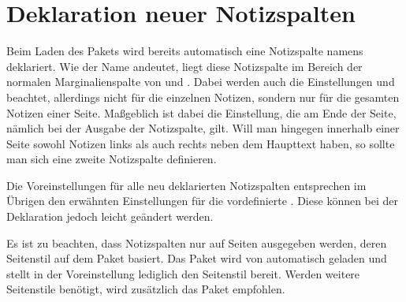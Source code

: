 
\section{Deklaration neuer Notizspalten}

Beim Laden des Pakets wird bereits automatisch eine Notizspalte namens
 deklariert. Wie der Name andeutet, liegt diese Notizspalte
im Bereich der normalen Marginalienspalte von 
und . Dabei werden auch die Einstellungen
 und  beachtet, allerdings
nicht für die einzelnen Notizen, sondern nur für die gesamten Notizen einer
Seite. Maßgeblich ist dabei die Einstellung, die am Ende der Seite, nämlich
bei der Ausgabe der Notizspalte, gilt. Will man hingegen innerhalb einer Seite
sowohl Notizen links als auch rechts neben dem Haupttext haben, so sollte man
sich eine zweite Notizspalte definieren.

Die Voreinstellungen für alle neu deklarierten Notizspalten entsprechen im
Übrigen den erwähnten Einstellungen für die vordefinierte
. %
\iftrue%
Diese können bei der Deklaration jedoch leicht geändert werden.%
\fi

Es ist zu beachten, dass Notizspalten nur auf Seiten
ausgegeben werden, deren Seitenstil auf dem Paket
\hyperref[cha:scrlayer]{}%
 basiert. Das Paket
\hyperref[cha:scrlayer]{} wird von
 automatisch geladen und stellt in der
Voreinstellung lediglich den Seitenstil
 bereit. Werden weitere Seitenstile
benötigt, wird zusätzlich das Paket
\hyperref[cha:scrlayer-scrpage]{}%
%
empfohlen.

